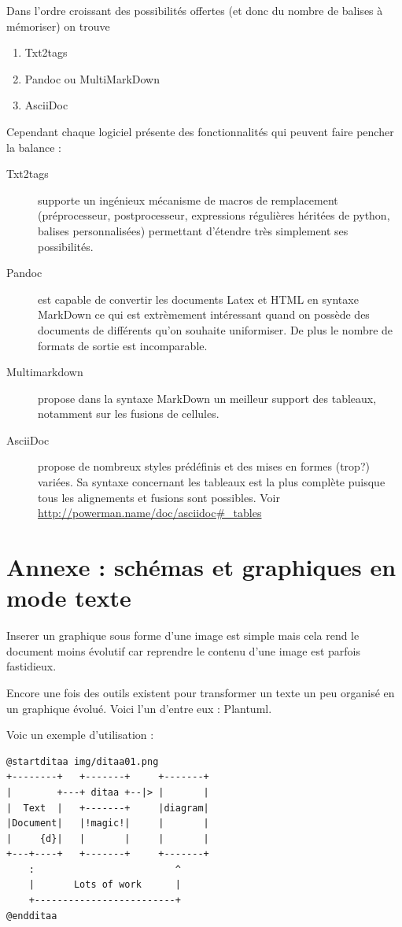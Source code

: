 \documentclass[12pt]{article}
\begin{document}
Dans l'ordre croissant des possibilités offertes (et donc du nombre de
balises à mémoriser) on trouve

\begin{enumerate}[1.]
\item
  Txt2tags
\item
  Pandoc ou MultiMarkDown
\item
  AsciiDoc
\end{enumerate}
Cependant chaque logiciel présente des fonctionnalités qui peuvent faire
pencher la balance :

\begin{description}
\item[Txt2tags]
supporte un ingénieux mécanisme de macros de remplacement
(préprocesseur, postprocesseur, expressions régulières héritées de
python, balises personnalisées) permettant d'étendre très simplement ses
possibilités.

\item[Pandoc]
est capable de convertir les documents Latex et HTML en syntaxe MarkDown
ce qui est extrèmement intéressant quand on possède des documents de
différents qu'on souhaite uniformiser. De plus le nombre de formats de
sortie est incomparable.

\item[Multimarkdown]
propose dans la syntaxe MarkDown un meilleur support des tableaux,
notamment sur les fusions de cellules.

\item[AsciiDoc]
propose de nombreux styles prédéfinis et des mises en formes (trop?)
variées. Sa syntaxe concernant les tableaux est la plus complète puisque
tous les alignements et fusions sont possibles. Voir
\url{http://powerman.name/doc/asciidoc#_tables}

\end{description}
\section{Annexe : schémas et graphiques en mode texte}

Inserer un graphique sous forme d'une image est simple mais cela rend le
document moins évolutif car reprendre le contenu d'une image est parfois
fastidieux.

Encore une fois des outils existent pour transformer un texte un peu
organisé en un graphique évolué. Voici l'un d'entre eux : Plantuml.

Voic un exemple d'utilisation :

\begin{verbatim}
@startditaa img/ditaa01.png
+--------+   +-------+     +-------+
|        +---+ ditaa +--|> |       |
|  Text  |   +-------+     |diagram|
|Document|   |!magic!|     |       |
|     {d}|   |       |     |       |
+---+----+   +-------+     +-------+
    :                         ^
    |       Lots of work      |
    +-------------------------+
@endditaa
\end{verbatim}
\end{document}
